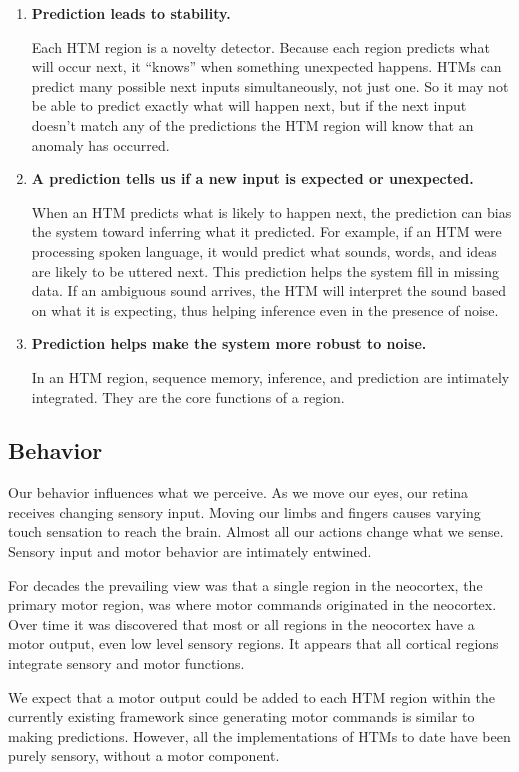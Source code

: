 \documentclass{report}
\begin{document}
\begin{enumerate}
\item {\bf Prediction leads to stability.}

Each HTM region is a novelty detector. Because each region predicts
what will occur next, it ``knows'' when something unexpected
happens. HTMs can predict many possible next inputs simultaneously,
not just one. So it may not be able to predict exactly what will
happen next, but if the next input doesn't match any of the
predictions the HTM region will know that an anomaly has occurred.

\item {\bf A prediction tells us if a new input is expected or unexpected.}

When an HTM predicts what is likely to happen next, the prediction can
bias the system toward inferring what it predicted. For example, if an
HTM were processing spoken language, it would predict what sounds,
words, and ideas are likely to be uttered next. This prediction helps
the system fill in missing data. If an ambiguous sound arrives, the
HTM will interpret the sound based on what it is expecting, thus
helping inference even in the presence of noise.

\item {\bf Prediction helps make the system more robust to noise.}

In an HTM region, sequence memory, inference, and prediction are
intimately integrated. They are the core functions of a region.

\end{enumerate}

\subsection*{Behavior}

Our behavior influences what we perceive. As we move our eyes, our
retina receives changing sensory input. Moving our limbs and fingers
causes varying touch sensation to reach the brain. Almost all our
actions change what we sense. Sensory input and motor behavior are
intimately entwined.

For decades the prevailing view was that a single region in the
neocortex, the primary motor region, was where motor commands
originated in the neocortex. Over time it was discovered that most or
all regions in the neocortex have a motor output, even low level
sensory regions. It appears that all cortical regions integrate
sensory and motor functions.

We expect that a motor output could be added to each HTM region within
the currently existing framework since generating motor commands is
similar to making predictions. However, all the implementations of
HTMs to date have been purely sensory, without a motor component.
\end{document}
